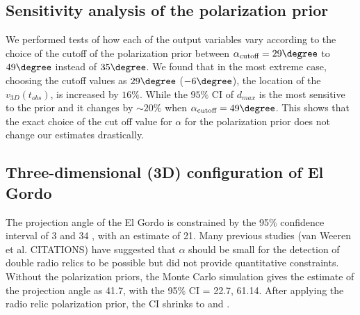 \subsection{Sensitivity analysis of the polarization prior}
%
\label{sec:sensitivityTests}
We performed tests of how each of the output variables vary according to the
choice of the cutoff of the polarization prior between
$\alpha_{\text{cutoff}} =
29 \degree$ to $49\degree$ instead of $35 \degree$.  
We found that in the most extreme case, choosing the cutoff values as $29
\degree$ ($-6 \degree$), the location of the $v_{3D}(t_{obs})$, is
increased by $ 16 \%$. While the $95\%$ CI of $d_{max}$ is
the most sensitive to the prior and it changes by
$\sim20 \%$ when $\alpha_{\text{cutoff}} = 49 \degree$. 
This shows that the exact choice of the cut off value for $\alpha$ for the
polarization prior does not change our estimates drastically.

\subsection{Three-dimensional (3D) configuration of El Gordo}
The projection angle of the El Gordo is constrained by the 95\% confidence
interval of 3 \degree and
34 \degree, with an estimate of 21\degree.  
Many previous studies (van Weeren et al. CITATIONS) have suggested that
$\alpha$ should be small for the detection of double radio relics to be
possible but did not provide quantitative constraints.    
Without the polarization priors, the Monte Carlo simulation gives the estimate
of the projection angle as 41.7\degree, with the 95\% CI = 22.7\degree, 61.14\degree.  
After applying the radio relic polarization prior, the CI shrinks to 
\degree and \degree.


